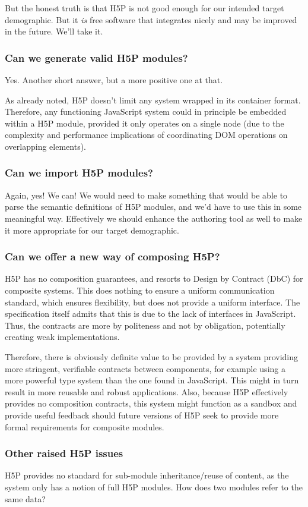 But the honest truth is that H5P is not good enough for our intended target 
demographic. But it \emph{is} free software that integrates nicely and may be 
improved in the future. We'll take it.

\subsubsection{Can we generate valid H5P modules?}

Yes. Another short answer, but a more positive one at that.

As already noted, H5P doesn't limit any system wrapped in its container
format. Therefore, any functioning JavaScript system could in principle be
embedded within a H5P module, provided it only operates on a single node (due 
to the complexity and performance implications of coordinating DOM operations 
on overlapping elements).

\subsubsection{Can we import H5P modules?}

Again, yes! We can! We would need to make something that would be able to 
parse the semantic definitions of H5P modules, and we'd have to use this in 
some meaningful way. Effectively we should enhance the authoring tool as well 
to make it more appropriate for our target demographic.

\subsubsection{Can we offer a new way of composing H5P?}

H5P has no composition guarantees, and resorts to Design by Contract (DbC) for
composite systems.\cite{h5pdbc} This does nothing to ensure a uniform
communication standard, which ensures flexibility, but does not provide a
uniform interface. The specification itself admits that this is due to the lack
of interfaces in JavaScript. Thus, the contracts are more by politeness and not
by obligation, potentially creating weak implementations.

Therefore, there is obviously definite value to be provided by a system
providing more stringent, verifiable contracts between components, for example
using a more powerful type system than the one found in JavaScript. This might
in turn result in more reusable and robust applications. Also, because H5P 
effectively provides no composition contracts, this system might function as a 
sandbox and provide useful feedback should future versions of H5P seek to 
provide more formal requirements for composite modules.

\subsubsection{Other raised H5P issues}

H5P provides no standard for sub-module inheritance/reuse of content, as the 
system only has a notion of full H5P modules. How does two modules refer to
the same data?
